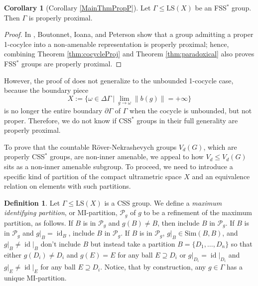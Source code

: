 \documentclass[12pt]{amsart}
\numberwithin{equation}{subsection}
\theoremstyle{definition}
\newtheorem{corollary}[theorem]{Corollary}
\theoremstyle{definition}
\newtheorem{definition}[theorem]{Definition}
\theoremstyle{remark}
\begin{document}
\begin{corollary}[Corollary \ref{MainThmPropP}]\label{cor:properproximal}
    Let $\Gamma \leq \text{LS}(X)$ be an FSS$^*$ group. Then $\Gamma$ is properly proximal.
\end{corollary}

\begin{proof}
In \cite{boutonnet2021properly}, Boutonnet, Ioana, and Peterson show that a group admitting a proper 1-cocylce into a non-amenable representation is properly proximal; hence, combining Theorem \ref{thm:cocycleProj} and Theorem \ref{thm:paradoxical} also proves FSS$^*$ groups are properly proximal. 
\end{proof}

However, the proof of \cite[Theorem 4.7]{boutonnet2021properly} does not generalize to the unbounded 1-cocycle case, because the boundary piece 
$$X:= \{\omega \in \Delta \Gamma \: \vert \: \lim_{g \rightarrow \omega} \|b(g)\| = + \infty \}$$ 
is no longer the entire boundary $\partial\Gamma$ of $\Gamma$ when the cocycle is unbounded, but not proper. Therefore, we do not know if CSS$^*$ groups in their full generality are properly proximal.

To prove that the countable R\"{o}ver-Nekrashevych groups $V_d(G)$, which are properly CSS$^*$ groups, are non-inner amenable, we appeal to how $V_d \leq V_d(G)$ sits as a non-inner amenable subgroup. To proceed, we need to introduce a specific kind of partition of the compact ultrametric space $X$ and an equivalence relation on elements with such partitions. 


\begin{definition}
Let $\Gamma \leq \text{LS}(X)$ is a CSS group. We define a \emph{maximum identifying partition}, or MI-partition, $\mathcal P_g$ of $g$ to be a refinement of the maximum partition, as follows. If $B$ is in $\mathcal P_g$ and $g(B) \ne B$, then include $B$ in $\mathcal P_g$. If $B$ is in $\mathcal P_g$ and $g\vert_B = \operatorname{id}_B$, include $B$ in $\mathcal P_g$. If $B$ is in $\mathcal P_g$, $g\vert_B \in \text{Sim}(B,B)$,  and $g\vert_B \ne \operatorname{id}\vert_B$ don't include $B$ but instead take a partition $B = \{D_1, \dots, D_n\}$ so that either $g(D_i) \neq D_i$ and $g(E) =E$ for any ball $E \supseteq D_i$ or $g\vert_{D_i}=\operatorname{id}\vert_{D_i}$ and $g\vert_E \ne \operatorname{id}\vert_E$ for any ball  $E \supseteq D_i$. Notice, that by construction, any $g \in \Gamma$ has a unique MI-partition.
\end{definition}
\end{document}
